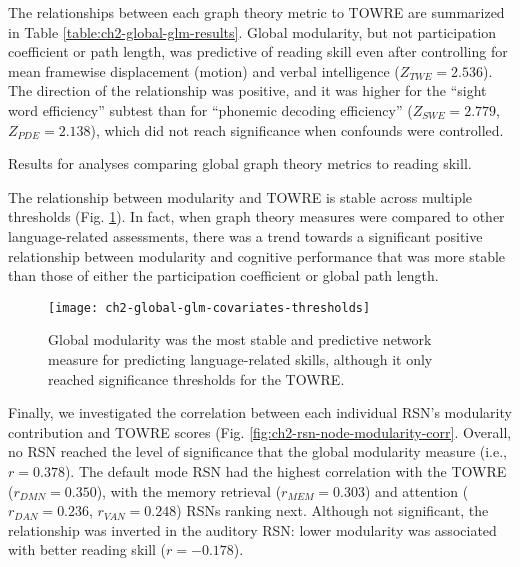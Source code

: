 \begin{itmeize}
The relationships between each graph theory metric to TOWRE are summarized in Table \ref{table:ch2-global-glm-results}. Global modularity, but not participation coefficient or path length, was predictive of reading skill even after controlling for mean framewise displacement (motion) and verbal intelligence ($Z_{TWE} = 2.536$). The direction of the relationship was positive, and it was higher for the ``sight word efficiency'' subtest than for ``phonemic decoding efficiency'' ($Z_{SWE} = 2.779$, $Z_{PDE} = 2.138$), which did not reach significance when confounds were controlled. 

\begin{table}[t]
    \renewcommand{\tabcolsep}{0.09cm}
    \centering
    
    \caption{Results for analyses comparing global graph theory metrics to reading skill.}
    \label{table:ch2-global-glm-results}
\end{table}

The relationship between modularity and TOWRE is stable across multiple thresholds (Fig. \ref{fig:ch2-global-glm-covariates-thresh}). In fact, when graph theory measures were compared to other language-related assessments, there was a trend towards a significant positive relationship between modularity and cognitive performance that was more stable than those of either the participation coefficient or global path length. 

\begin{figure}[t]
    \centering
    \texttt{[image: ch2-global-glm-covariates-thresholds]}
    \caption[Modularity metrics at rest are the best predictors of cognitive skills.] {Global modularity was the most stable and predictive network measure for predicting language-related skills, although it only reached significance thresholds for the TOWRE.}
    \label{fig:ch2-global-glm-covariates-thresh}
\end{figure}

Finally, we investigated the correlation between each individual RSN's modularity contribution and TOWRE scores (Fig. \ref{fig:ch2-rsn-node-modularity-corr}. Overall, no RSN reached the level of significance that the global modularity measure (i.e., $r = 0.378$). The default mode RSN had the highest correlation with the TOWRE ($r_{DMN} = 0.350$), with the memory retrieval ($r_{MEM} = 0.303$) and attention ($r_{DAN} = 0.236$, $r_{VAN} = 0.248$) RSNs ranking next. Although not significant, the relationship was inverted in the auditory RSN: lower modularity was associated with better reading skill ($r = -0.178$).


\end{itmeize}

